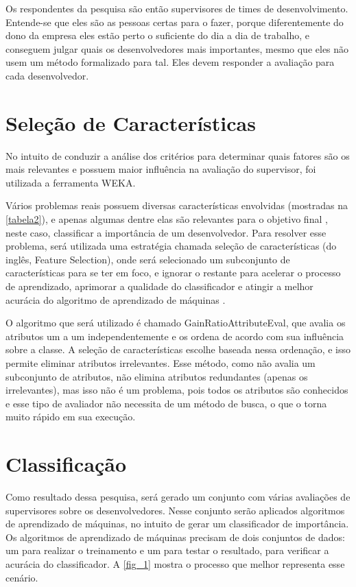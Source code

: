 Os respondentes da pesquisa são então supervisores de times de desenvolvimento. Entende-se que eles são as pessoas certas para o fazer, porque diferentemente do dono da empresa eles estão perto o suficiente do dia a dia de trabalho, e conseguem julgar quais os desenvolvedores mais importantes, mesmo que eles não usem um método formalizado para tal. Eles devem responder a avaliação para cada desenvolvedor.

\section{Seleção de Características}\label{secao3.3}

No intuito de conduzir a análise dos critérios para determinar quais fatores são os mais relevantes e possuem maior influência na avaliação do supervisor, foi utilizada a ferramenta WEKA.

Vários problemas reais possuem diversas características envolvidas (mostradas na \autoref{tabela2}), e apenas algumas dentre elas são relevantes para o objetivo final \cite{Kira1992}, neste caso, classificar a importância de um desenvolvedor. Para resolver esse problema, será utilizada uma estratégia chamada seleção de características (do inglês, Feature Selection), onde será selecionado um subconjunto de características para se ter em foco, e ignorar o restante para acelerar o processo de aprendizado, aprimorar a qualidade do classificador e atingir a melhor acurácia do algoritmo de aprendizado de máquinas \cite{Kira1992,Kohavi1997}. 

O algoritmo que será utilizado é chamado GainRatioAttributeEval, que avalia os atributos um a um independentemente e os ordena de acordo com sua influência sobre a classe. A seleção de características escolhe baseada nessa ordenação, e isso permite eliminar atributos irrelevantes. Esse método, como não avalia um subconjunto de atributos, não elimina atributos redundantes (apenas os irrelevantes), mas isso não é um problema, pois todos os atributos são conhecidos e esse tipo de avaliador não necessita de um método de busca, o que o torna muito rápido em sua execução.

\section{Classificação}\label{secao3.4}

Como resultado dessa pesquisa, será gerado um conjunto com várias avaliações de supervisores sobre os desenvolvedores. Nesse conjunto serão aplicados algoritmos de aprendizado de máquinas, no intuito de gerar um classificador de importância. Os algoritmos de aprendizado de máquinas precisam de dois conjuntos de dados: um para realizar o treinamento e um para testar o resultado, para verificar a acurácia do classificador. A \autoref{fig_1} mostra o processo que melhor representa esse cenário.

